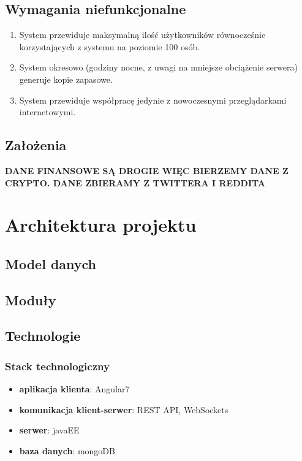 \subsection{Wymagania niefunkcjonalne}
\begin{enumerate}
  \item {System przewiduje maksymalną ilość użytkowników równocześnie korzystających z systemu na poziomie 100 osób.}
  \item {System okresowo (godziny nocne, z uwagi na mniejsze obciążenie serwera) generuje kopie zapasowe.}
  \item {System przewiduje współpracę jedynie z nowoczesnymi przeglądarkami internetowymi.}
\end{enumerate}
\clearpage
\subsection{Założenia}
\textbf{DANE FINANSOWE SĄ DROGIE WIĘC BIERZEMY DANE Z CRYPTO. DANE ZBIERAMY Z TWITTERA I REDDITA}
\section{Architektura projektu}
\subsection{Model danych}
\subsection{Moduły}
\subsection{Technologie}
\subsubsection{Stack technologiczny}
\begin{itemize}
  \item {\textbf{aplikacja klienta}: Angular7}
  \item {\textbf{komunikacja klient-serwer}: REST API, WebSockets}
  \item {\textbf{serwer}: javaEE}
  \item {\textbf{baza danych}: mongoDB}
\end{itemize}
